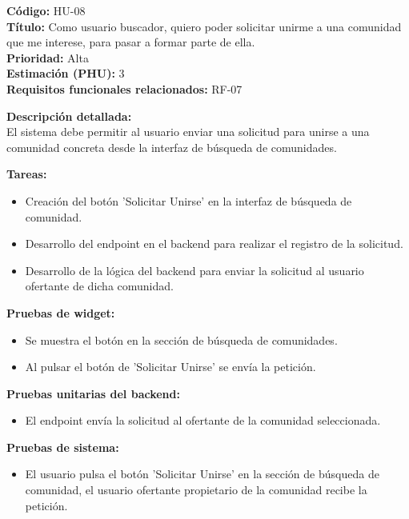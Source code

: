 \begin{tarjetaHU}
\textbf{Código:} HU-08 \\
\textbf{Título:} Como usuario buscador, quiero poder solicitar unirme a una comunidad que me interese, para pasar a formar parte de ella. \\
\textbf{Prioridad:} Alta \\
\textbf{Estimación (PHU):} 3 \\
\textbf{Requisitos funcionales relacionados:} RF-07

\vspace{0.5em}
\textbf{Descripción detallada:} \\
El sistema debe permitir al usuario enviar una solicitud para unirse a una comunidad concreta desde la interfaz de búsqueda de comunidades.

\vspace{0.5em}
\textbf{Tareas:}
\begin{itemize}[left=0pt]
  \item Creación del botón 'Solicitar Unirse' en la interfaz de búsqueda de comunidad. 
  \item Desarrollo del endpoint en el backend para realizar el registro de la solicitud.
  \item Desarrollo de la lógica del backend para enviar la solicitud al usuario ofertante de dicha comunidad.
\end{itemize}

\vspace{0.5em}
\textbf{Pruebas de widget:}
\begin{itemize}[left=0pt]
  \item Se muestra el botón en la sección de búsqueda de comunidades.
  \item Al pulsar el botón de 'Solicitar Unirse' se envía la petición.
\end{itemize}
\textbf{Pruebas unitarias del backend:}
\begin{itemize}[left=0pt]
  \item El endpoint envía la solicitud al ofertante de la comunidad seleccionada.
\end{itemize}
\textbf{Pruebas de sistema:}
\begin{itemize}[left=0pt]
  \item El usuario pulsa el botón 'Solicitar Unirse' en la sección de búsqueda de comunidad, el usuario ofertante propietario de la comunidad recibe la petición.
\end{itemize}
\end{tarjetaHU}


